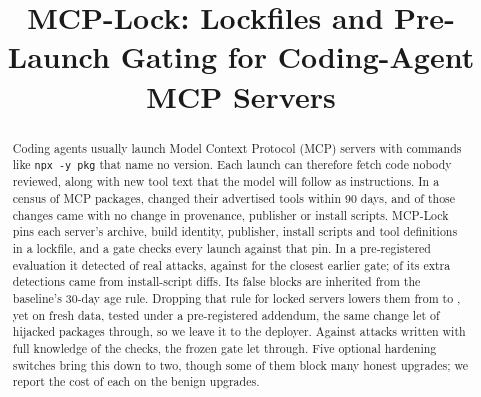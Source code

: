 \documentclass[conference]{IEEEtran}
\newcommand{\code}[1]{\texttt{#1}}
\begin{document}
\title{MCP-Lock: Lockfiles and Pre-Launch Gating for Coding-Agent MCP Servers}

\author{
\and
{}
}

\maketitle

\begin{abstract}
Coding agents usually launch Model Context Protocol (MCP) servers with commands like \code{npx -y pkg} that name no
version. Each launch can therefore fetch code nobody reviewed, along with new tool text that the model will follow as
instructions. In a census of \CensusSample{} MCP packages, \DriftPkgsP{} changed their advertised tools within 90 days,
and \NoSignalP{} of those changes came with no change in provenance, publisher or install scripts. MCP-Lock pins each
server's archive, build identity, publisher, install scripts and tool definitions in a lockfile, and a gate checks every
launch against that pin. In a pre-registered evaluation it detected \DetGP{} of \NR{} real attacks, against \DetSCP{}
for the closest earlier gate; \AblFour{} of its \AddedDet{} extra detections came from install-script diffs. Its false
blocks are inherited from the baseline's 30-day age rule. Dropping that rule for locked servers lowers them from \FbGP{}
to \AgeFbP, yet on fresh data, tested under a pre-registered addendum, the same change let \AoneLost{} of \AoneRC{}
hijacked packages through, so we leave it to the deployer. Against \ENCases{} attacks written with full knowledge
of the checks, the frozen gate let \EGAllow{} through. Five optional hardening switches bring this down to two, though
some of them block many honest upgrades; we report the cost of each on the \NB{} benign upgrades.
\end{abstract}
\end{document}
